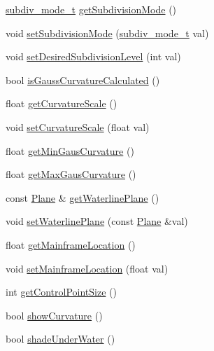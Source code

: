 \begin{DoxyCompactItemize}
\hyperlink{namespaceShipCAD_a4a9d1acfd6a2e1e9078a5dcc36f0c817}{subdiv\-\_\-mode\-\_\-t} \hyperlink{classShipCAD_1_1SubdivisionSurface_a77ac47de5e6323271f45be37223fe82b}{get\-Subdivision\-Mode} ()
\item 
void \hyperlink{classShipCAD_1_1SubdivisionSurface_a048dce00d2ff87aa5b31319ea41f565a}{set\-Subdivision\-Mode} (\hyperlink{namespaceShipCAD_a4a9d1acfd6a2e1e9078a5dcc36f0c817}{subdiv\-\_\-mode\-\_\-t} val)
\item 
void \hyperlink{classShipCAD_1_1SubdivisionSurface_a53271216c1be89154c08d2b2841f9a60}{set\-Desired\-Subdivision\-Level} (int val)
\item 
bool \hyperlink{classShipCAD_1_1SubdivisionSurface_aa6e07e073f76fb31d013103c8709f923}{is\-Gauss\-Curvature\-Calculated} ()
\item 
float \hyperlink{classShipCAD_1_1SubdivisionSurface_a8dfd63bd3bd8ddf35491b12003a8b7ce}{get\-Curvature\-Scale} ()
\item 
void \hyperlink{classShipCAD_1_1SubdivisionSurface_af0de3c1d862ddb2466effbcff0189845}{set\-Curvature\-Scale} (float val)
\item 
float \hyperlink{classShipCAD_1_1SubdivisionSurface_ae511889be6115d7461808eda144947a8}{get\-Min\-Gaus\-Curvature} ()
\item 
float \hyperlink{classShipCAD_1_1SubdivisionSurface_a5189aba41418c44faae76b39284917c2}{get\-Max\-Gaus\-Curvature} ()
\item 
const \hyperlink{classShipCAD_1_1Plane}{Plane} \& \hyperlink{classShipCAD_1_1SubdivisionSurface_a5f4515130c512327b01e6aea577d0876}{get\-Waterline\-Plane} ()
\item 
void \hyperlink{classShipCAD_1_1SubdivisionSurface_ae063d1a2be4e227aaefb8a3578d3f52f}{set\-Waterline\-Plane} (const \hyperlink{classShipCAD_1_1Plane}{Plane} \&val)
\item 
float \hyperlink{classShipCAD_1_1SubdivisionSurface_a8b33594cec15c0ec7aa03eb9d53327bb}{get\-Mainframe\-Location} ()
\item 
void \hyperlink{classShipCAD_1_1SubdivisionSurface_a81d5637d3b405da5975eb8e86d058bcd}{set\-Mainframe\-Location} (float val)
\item 
int \hyperlink{classShipCAD_1_1SubdivisionSurface_a521c5ea29e765a0cf7bc0ec0268b499c}{get\-Control\-Point\-Size} ()
\item 
bool \hyperlink{classShipCAD_1_1SubdivisionSurface_ac7c4656b21e0aaa01525be5b7be84024}{show\-Curvature} ()
\item 
bool \hyperlink{classShipCAD_1_1SubdivisionSurface_adfb570208c96bf8bc3426a43fda5fe9f}{shade\-Under\-Water} ()

\end{DoxyCompactItemize}
